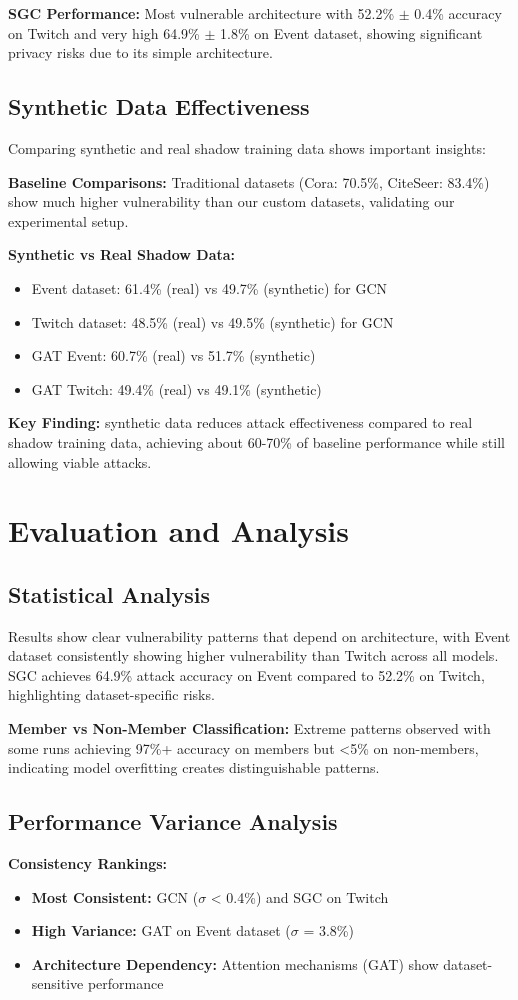 \documentclass{article}
\begin{document}
\textbf{SGC Performance:} Most vulnerable architecture with 52.2\% $\pm$ 0.4\% accuracy on Twitch and very high 64.9\% $\pm$ 1.8\% on Event dataset, showing significant privacy risks due to its simple architecture.

\subsection{Synthetic Data Effectiveness}
Comparing synthetic and real shadow training data shows important insights:

\textbf{Baseline Comparisons:} Traditional datasets (Cora: 70.5\%, CiteSeer: 83.4\%) show much higher vulnerability than our custom datasets, validating our experimental setup.

\textbf{Synthetic vs Real Shadow Data:}
\begin{itemize}
\item Event dataset: 61.4\% (real) vs 49.7\% (synthetic) for GCN
\item Twitch dataset: 48.5\% (real) vs 49.5\% (synthetic) for GCN
\item GAT Event: 60.7\% (real) vs 51.7\% (synthetic)
\item GAT Twitch: 49.4\% (real) vs 49.1\% (synthetic)
\end{itemize}

\textbf{Key Finding:} synthetic data reduces attack effectiveness compared to real shadow training data, achieving about 60-70\% of baseline performance while still allowing viable attacks.

\section{Evaluation and Analysis}
\subsection{Statistical Analysis}
Results show clear vulnerability patterns that depend on architecture, with Event dataset consistently showing higher vulnerability than Twitch across all models. SGC achieves 64.9\% attack accuracy on Event compared to 52.2\% on Twitch, highlighting dataset-specific risks.

\textbf{Member vs Non-Member Classification:} Extreme patterns observed with some runs achieving 97\%+ accuracy on members but <5\% on non-members, indicating model overfitting creates distinguishable patterns.

\subsection{Performance Variance Analysis}
\textbf{Consistency Rankings:}
\begin{itemize}
\item \textbf{Most Consistent:} GCN ($\sigma$ < 0.4\%) and SGC on Twitch
\item \textbf{High Variance:} GAT on Event dataset ($\sigma$ = 3.8\%)
\item \textbf{Architecture Dependency:} Attention mechanisms (GAT) show dataset-sensitive performance
\end{itemize}
\end{document}
